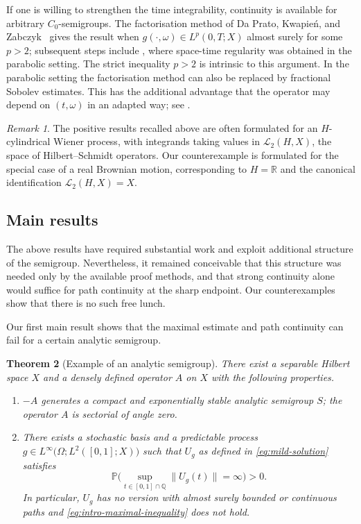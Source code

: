 \documentclass[11pt]{amsart}
\newtheorem{theorem}{Theorem}[section]
\theoremstyle{definition}
\theoremstyle{remark}
\newtheorem{remark}[theorem]{Remark}
\numberwithin{equation}{section}
\renewcommand{\P}{\mathbb P}
\newcommand{\Q}{\mathbb Q}
\newcommand{\1}{\mathbf 1}
\newcommand{\norm}[1]{\lVert #1\rVert}
\begin{document}
If one is willing to strengthen the time integrability, continuity is
available for arbitrary \(C_0\)-semigroups.  The factorisation method of Da
Prato, Kwapie\'n, and Zabczyk~\cite{DaPratoKwapienZabczyk1987, DPZ92} gives the
result when \(g(\cdot,\omega)\in L^p(0,T;X)\) almost surely for some
\(p>2\); subsequent steps
include \cite{Seidler1993,Brzezniak1997,Ver10JEE}, where space-time regularity was obtained in the parabolic setting. The strict inequality \(p>2\)
is intrinsic to this argument.  In the parabolic setting the
factorisation method can also be replaced by fractional Sobolev estimates.
This has the additional advantage that the operator may depend on
\((t,\omega)\) in an adapted way; see \cite{PronkVer}.

\begin{remark}
    The positive results recalled above are often formulated for an \(H\)-cylindrical Wiener process, with integrands taking values in \(\mathscr{L}_2(H,X)\), the space of Hilbert--Schmidt operators.
Our counterexample is formulated for the special case of a real Brownian motion, corresponding to \(H=\mathbb R\) and the canonical identification \(\mathscr{L}_2(H,X) =  X\).
\end{remark}

\subsection{Main results}
The above results have required substantial work and exploit additional structure of the semigroup. Nevertheless, it remained conceivable that this structure was needed only by the available proof methods, and that strong continuity alone would suffice for path continuity at the sharp endpoint. Our counterexamples show that there is no such free lunch.


Our first main result shows that the maximal estimate and path continuity can fail for a certain analytic semigroup.

\begin{theorem}[Example of an analytic semigroup]
\label{thm:main}
There exist a separable Hilbert space \(X\) and a
densely defined operator \(A\) on \(X\) with the following properties.
\begin{enumerate}[label=\textup{(\roman*)}]
\item\label{it:main1} \(-A\) generates a compact and exponentially stable analytic semigroup
\(S\); the operator \(A\) is sectorial of angle zero.
\item\label{it:main2} There exists a stochastic basis and a 
predictable process $g\in L^\infty\bigl(\Omega;L^2([0,1];X)\bigr)$
such that $U_g$ as defined in \eqref{eq:mild-solution}
satisfies
\begin{equation*}
 \P\Big(
  \sup_{t\in[0,1]\cap\Q}\norm{U_g(t)}=\infty
 \Big)>0.
\end{equation*}
In particular, \(U_g\) has no version with almost surely bounded or continuous paths and \eqref{eq:intro-maximal-inequality} does not hold.
\end{enumerate}
\end{theorem}
\end{document}
